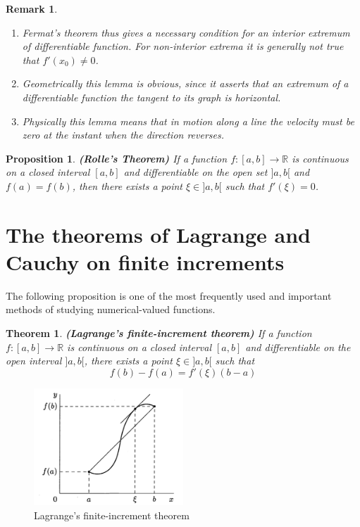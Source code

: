 \documentclass[a4paper,12pt]{article} %
\newtheorem{theorem}{Theorem}[section]
\newtheorem{proposition}{Proposition}[section]
\newtheorem*{remark}{Remark}
\begin{document}
\begin{remark}
    \normalfont 
    \begin{enumerate}
        \item Fermat's theorem thus gives a necessary condition for an interior
            extremum of differentiable function. For non-interior extrema it is 
            generally not true that $f'(x_0) \ne 0$.
        \item Geometrically this lemma is obvious, since it asserts that an extremum 
            of a differentiable function the tangent to its graph is horizontal.
        \item Physically this lemma means that in motion along a line the velocity 
            must be zero at the instant when the direction reverses.
    \end{enumerate}
\end{remark}

\begin{proposition}{\rm \textbf{(Rolle's Theorem)}}
    \rm If a function $f: [a,b] \to \mathbb{R}$ is continuous on a closed 
    interval $[a,b]$ and differentiable on the open set $]a,b[$ and $f(a) = f(b)$,
    then there exists a point $\xi \in ]a,b[$ such that $f'(\xi) = 0$.
\end{proposition}

\section{The theorems of Lagrange and Cauchy on finite increments}
The following proposition is one of the most frequently used and important methods 
of studying numerical-valued functions.

\begin{theorem}{\rm \textbf{(Lagrange's finite-increment theorem)}}
    \normalfont If a function $f: [a,b] \to \mathbb{R}$ is continuous on a closed 
    interval $[a,b]$ and differentiable on the open interval $]a,b[$, there 
    exists a point $\xi \in ]a,b[$ such that 
    \begin{equation}
        f(b) - f(a) = f'(\xi)(b-a)
        \label{eq:eq1}
    \end{equation}
\end{theorem}

\graphicspath{
    {./Figs/}
}
\begin{figure}[htbp]
    \centering
    \includegraphics[width=0.5\textwidth,height=0.4\textwidth]{lagrange.png}
    \caption{Lagrange's finite-increment theorem}
    \label{fig:lagrange}
\end{figure}
\end{document}
